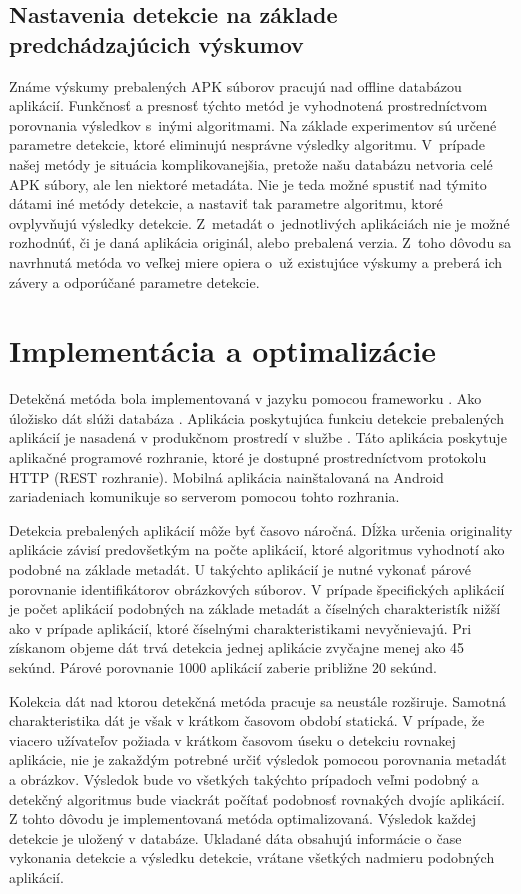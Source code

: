 \subsection*{Nastavenia detekcie na základe predchádzajúcich výskumov}
Známe výskumy prebalených APK súborov pracujú nad offline databázou aplikácií. Funkčnosť a presnosť týchto metód je vyhodnotená prostredníctvom porovnania výsledkov s~inými algoritmami. Na základe experimentov sú určené parametre detekcie, ktoré eliminujú nesprávne výsledky algoritmu. V~prípade našej metódy je situácia komplikovanejšia, pretože našu databázu netvoria celé APK súbory, ale len niektoré metadáta. Nie je teda možné spustiť nad týmito dátami iné metódy detekcie, a nastaviť tak parametre algoritmu, ktoré ovplyvňujú výsledky detekcie. Z~metadát o~jednotlivých aplikáciách nie je možné rozhodnúť, či je daná aplikácia originál, alebo prebalená verzia.  Z~toho dôvodu sa navrhnutá metóda vo veľkej miere opiera o~už existujúce výskumy a preberá ich závery a odporúčané parametre detekcie. 

\section{Implementácia a optimalizácie}
Detekčná metóda bola implementovaná v jazyku  pomocou frameworku . Ako úložisko dát slúži databáza . Aplikácia poskytujúca funkciu detekcie prebalených aplikácií je nasadená v produkčnom prostredí v službe . Táto aplikácia poskytuje aplikačné programové rozhranie, ktoré je dostupné prostredníctvom protokolu HTTP (REST rozhranie). Mobilná aplikácia nainštalovaná na Android zariadeniach komunikuje so serverom pomocou tohto rozhrania. 

Detekcia prebalených aplikácií môže byť časovo náročná. Dĺžka určenia originality aplikácie závisí predovšetkým na počte aplikácií, ktoré algoritmus vyhodnotí ako podobné na základe metadát. U takýchto aplikácií je nutné vykonať párové porovnanie identifikátorov obrázkových súborov. V prípade špecifických aplikácií je počet aplikácií podobných na základe metadát a číselných charakteristík nižší ako v prípade aplikácií, ktoré číselnými charakteristikami nevyčnievajú. Pri získanom objeme dát trvá detekcia jednej aplikácie zvyčajne menej ako 45 sekúnd. Párové porovnanie 1000 aplikácií zaberie približne 20 sekúnd. 

Kolekcia dát nad ktorou detekčná metóda pracuje sa neustále rozširuje. Samotná charakteristika dát je však v krátkom časovom období statická. V prípade, že viacero užívateľov požiada v krátkom časovom úseku o detekciu rovnakej aplikácie, nie je zakaždým potrebné určiť  výsledok pomocou porovnania metadát a obrázkov. Výsledok bude vo všetkých takýchto prípadoch veľmi podobný a detekčný algoritmus bude viackrát počítať podobnosť rovnakých dvojíc aplikácií. Z tohto dôvodu je implementovaná metóda optimalizovaná. Výsledok každej detekcie je uložený v databáze. Ukladané dáta obsahujú informácie o čase vykonania detekcie a výsledku detekcie, vrátane všetkých nadmieru podobných aplikácií. 

